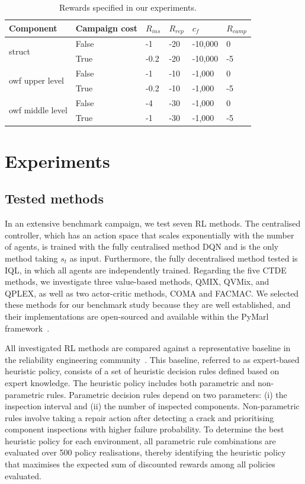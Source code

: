 \begin{table}
\centering
\begin{tabular}{llllll}
\toprule
Component & Campaign cost & $R_{ins}$ & $R_{rep}$ &  $c_f$ & $R_{camp}$ \\
\bottomrule
\multirow{2}{*}{struct} &  False & -1 & -20 & -10,000 & 0  \\ 
& True & -0.2 & -20 & -10,000 & -5   \\
\bottomrule
\multirow{2}{*}{owf upper level} & False & -1 & -10 & -1,000 & 0     \\
& True  & -0.2 & -10 & -1,000 & -5     \\
\multirow{2}{*}{owf middle level} & False & -4 & -30 & -1,000 & 0    \\
& True & -1 & -30 & -1,000 & -5    \\
\bottomrule
\end{tabular}
\caption{Rewards specified in our experiments.}
\label{tab:rewards_det}
\end{table}


\section{Experiments}\label{sec:ch5_experiments}
\subsection{Tested methods}
\label{sec:tested_method}
In an extensive benchmark campaign, we test seven RL methods.
The centralised controller, which has an action space that scales exponentially with the number of agents, is trained with the fully centralised method DQN and is the only method taking $s_t$ as input.
Furthermore, the fully decentralised method tested is IQL, in which all agents are independently trained.
Regarding the five CTDE methods, we investigate three value-based methods, QMIX, QVMix, and QPLEX, as well as two actor-critic methods, COMA and FACMAC.
We selected these methods for our benchmark study because they are well established, and their implementations are open-sourced and available within the PyMarl framework~\citep{samvelyan2019starcraft}.

All investigated RL methods are compared against a representative baseline in the reliability engineering community~\citep{LuqueDBN2019,morato2022syst}.
This baseline, referred to as expert-based heuristic policy, consists of a set of heuristic decision rules defined based on expert knowledge.
The heuristic policy includes both parametric and non-parametric rules.
Parametric decision rules depend on two parameters: (i) the inspection interval and (ii) the number of inspected components.
Non-parametric rules involve taking a repair action after detecting a crack and prioritising component inspections with higher failure probability.
To determine the best heuristic policy for each environment, all parametric rule combinations are evaluated over 500 policy realisations, thereby identifying the heuristic policy that maximises the expected sum of discounted rewards among all policies evaluated.

